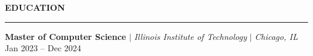 \documentclass[10pt,letterpaper]{article}
\begin{document}
\vspace{2mm}
{\hspace{0in}\small\textbf{EDUCATION}}\par
\vspace{-2mm}
\noindent\rule{\textwidth}{0.1pt}
\vspace{-4mm}

\hspace{0in}\textbf{Master of Computer Science} $|$ \textit{Illinois Institute of Technology} $|$ \textit{Chicago, IL} \hfill Jan 2023 -- Dec 2024  
\begin{itemize}[leftmargin=0.15in,nosep,topsep=3pt]
\end{itemize}
\end{document}
